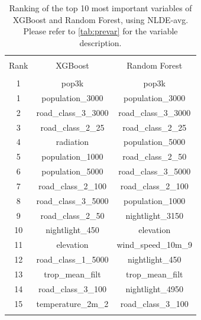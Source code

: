 \documentclass{article}
\begin{document}
\begin{table}[H] \centering 
  \caption{Ranking of the top 10 most important variables of XGBoost and Random Forest, using NLDE-avg. Please refer to  \cref{tab:prevar} for the variable description.} 
    \label{nlde_vimp} 
\begin{tabular}{@{\extracolsep{5pt}} ccc} 
\\[-1.8ex]\hline 
\hline \\[-1.8ex] 
Rank & XGBoost & Random Forest \\ 
\hline \\[-1.8ex] 
1 & pop3k & pop3k \\ 
1 & population\_3000 & population\_3000 \\ 
2 & road\_class\_3\_3000 & road\_class\_3\_3000 \\ 
3 & road\_class\_2\_25 & road\_class\_2\_25 \\ 
4 & radiation & population\_5000 \\ 
5 & population\_1000 & road\_class\_2\_50 \\ 
6 & population\_5000 & road\_class\_3\_5000 \\ 
7 & road\_class\_2\_100 & road\_class\_2\_100 \\ 
8 & road\_class\_3\_5000 & population\_1000 \\ 
9 & road\_class\_2\_50 & nightlight\_3150 \\ 
10 & nightlight\_450 & elevation \\ 
11 & elevation & wind\_speed\_10m\_9 \\ 
12 & road\_class\_1\_5000 & nightlight\_450 \\ 
13 & trop\_mean\_filt & trop\_mean\_filt \\ 
14 & road\_class\_3\_100 & nightlight\_4950 \\ 
15 & temperature\_2m\_2 & road\_class\_3\_100 \\ 

\hline \\[-1.8ex] 
\end{tabular} 
\end{table} 
\end{document}
